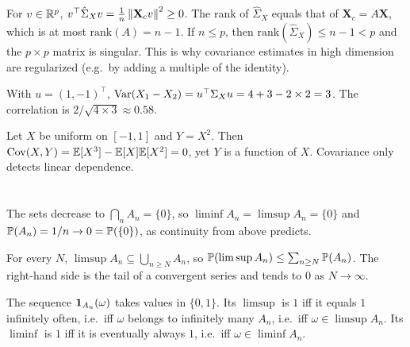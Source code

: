 \section{}

For $v\in\mathbb{R}^p$, $v^\top\hat\Sigma_Xv = \frac1n\left\|\mathbf X_cv\right\|^2\geq0$. The rank of
$\hat\Sigma_X$ equals that of $\mathbf X_c = A\mathbf X$, which is at most
$\mathrm{rank}(A) = n-1$. If $n\leq p$, then $\mathrm{rank}(\hat\Sigma_X)\leq n-1<p$ and the
$p\times p$ matrix is singular. This is why covariance estimates in high dimension
are regularized (e.g.\ by adding a multiple of the identity).

With $u = (1,-1)^\top$, $\operatorname{Var}(X_1 - X_2) = u^\top\Sigma_Xu = 4 + 3 - 2\times2 = 3$. The
correlation is $2/\sqrt{4\times3}\approx0.58$.

Let $X$ be uniform on $[-1,1]$ and $Y = X^2$. Then
$\operatorname{Cov}(X,Y) = \mathbb{E}[X^3] - \mathbb{E}[X]\mathbb{E}[X^2] = 0$, yet $Y$ is a function of $X$. Covariance only
detects linear dependence.

\section{}

The sets decrease to $\bigcap_nA_n = \{0\}$, so $\liminf A_n = \limsup A_n = \{0\}$ and
$\mathbb{P}(A_n) = 1/n\to0 = \mathbb{P}(\{0\})$, as continuity from above predicts.

For every $N$, $\limsup A_n\subseteq\bigcup_{n\geq N}A_n$, so
$\mathbb{P}(\limsup A_n)\leq\sum_{n\geq N}\mathbb{P}(A_n)$. The right-hand side is the tail of a
convergent series and tends to $0$ as $N\to\infty$.

The sequence $\mathbf{1}_{A_n}(\omega)$ takes values in $\{0,1\}$. Its $\limsup$ is $1$
iff it equals $1$ infinitely often, i.e.\ iff $\omega$ belongs to infinitely many
$A_n$, i.e.\ iff $\omega\in\limsup A_n$. Its $\liminf$ is $1$ iff it is eventually
always $1$, i.e.\ iff $\omega\in\liminf A_n$.

\section{}

